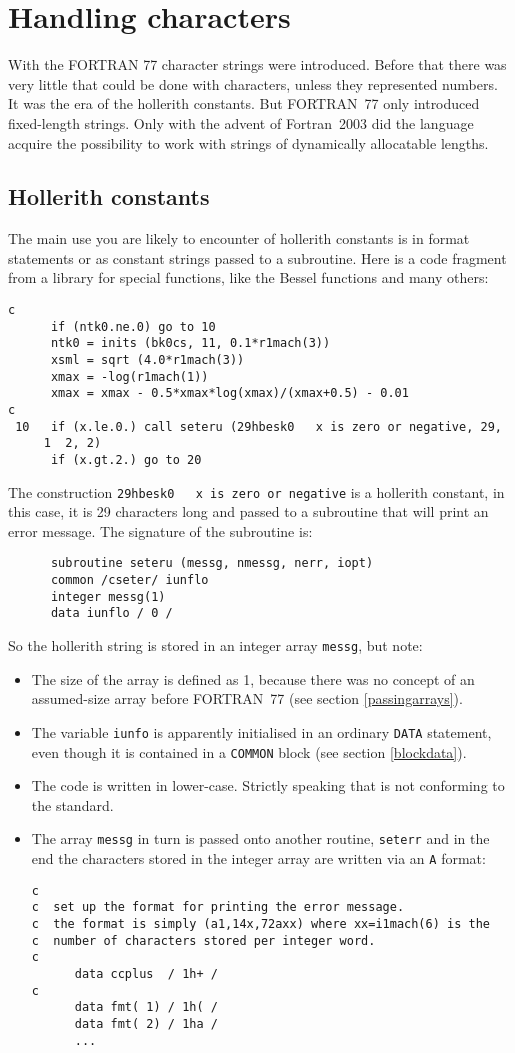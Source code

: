 \section{Handling characters}
With the FORTRAN 77 character strings were introduced. Before that there was very little
that could be done with characters, unless they represented numbers. It was the era
of the hollerith constants. But FORTRAN~77 only introduced fixed-length strings.
Only with the advent of Fortran~2003 did the language acquire the possibility to
work with strings of dynamically allocatable lengths.


\subsection{Hollerith constants}
The main use you are likely to encounter of hollerith constants is in format statements or
as constant strings passed to a subroutine. Here is
a code fragment from a library for special functions, like the Bessel functions and
many others:
\begin{verbatim}
c
      if (ntk0.ne.0) go to 10
      ntk0 = inits (bk0cs, 11, 0.1*r1mach(3))
      xsml = sqrt (4.0*r1mach(3))
      xmax = -log(r1mach(1))
      xmax = xmax - 0.5*xmax*log(xmax)/(xmax+0.5) - 0.01
c
 10   if (x.le.0.) call seteru (29hbesk0   x is zero or negative, 29,
     1  2, 2)
      if (x.gt.2.) go to 20
\end{verbatim}

The construction \verb+29hbesk0   x is zero or negative+ is a hollerith constant, in
this case, it is 29 characters long and passed to a subroutine that will print an
error message. The signature of the subroutine is:
\begin{verbatim}
      subroutine seteru (messg, nmessg, nerr, iopt)
      common /cseter/ iunflo
      integer messg(1)
      data iunflo / 0 /
\end{verbatim}

So the hollerith string is stored in an integer array \verb+messg+, but note:
\begin{itemize}
\item
The size of the array is defined as 1, because there was no concept of an assumed-size array
before FORTRAN~77 (see section \ref{passingarrays}).
\item
The variable \verb+iunfo+ is apparently initialised in an ordinary \verb+DATA+ statement,
even though it is contained in a \verb+COMMON+ block (see section \ref{blockdata}).
\item
The code is written in lower-case. Strictly speaking that is not conforming to the standard.
\item
The array \verb+messg+ in turn is passed onto another routine, \verb+seterr+ and in the end
the characters stored in the integer array are written via an \verb+A+ format:
\begin{verbatim}
c
c  set up the format for printing the error message.
c  the format is simply (a1,14x,72axx) where xx=i1mach(6) is the
c  number of characters stored per integer word.
c
      data ccplus  / 1h+ /
c
      data fmt( 1) / 1h( /
      data fmt( 2) / 1ha /
      ...
\end{verbatim}
\end{itemize}


